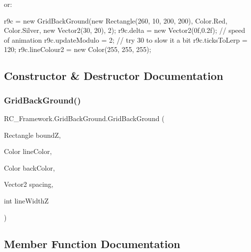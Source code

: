 or\+: ~\newline
\begin{DoxyVerb}  r9c = new GridBackGround(new Rectangle(260, 10, 200, 200), Color.Red, Color.Silver, new Vector2(30, 20), 2);
  r9c.delta = new Vector2(0f,0.2f); // speed of animation
  r9c.updateModulo = 2; // try 30 to slow it a bit
  r9c.ticksToLerp = 120;
  r9c.lineColour2 = new Color(255, 255, 255);
\end{DoxyVerb}
 

\subsection{Constructor \& Destructor Documentation}
\mbox{\label{class_r_c___framework_1_1_grid_back_ground_ac58b15afcc3b7fddc9aaa0f8decd3d7c}} 
\subsubsection{\texorpdfstring{Grid\+Back\+Ground()}{GridBackGround()}}
{\footnotesize\ttfamily R\+C\+\_\+\+Framework.\+Grid\+Back\+Ground.\+Grid\+Back\+Ground (\begin{DoxyParamCaption}\item[{Rectangle}]{boundZ,  }\item[{Color}]{line\+Color,  }\item[{Color}]{back\+Color,  }\item[{Vector2}]{spacing,  }\item[{int}]{line\+WidthZ }\end{DoxyParamCaption})}



\subsection{Member Function Documentation}
\mbox{\label{class_r_c___framework_1_1_grid_back_ground_a242904271618f793025f4dfae9681c13}} 
